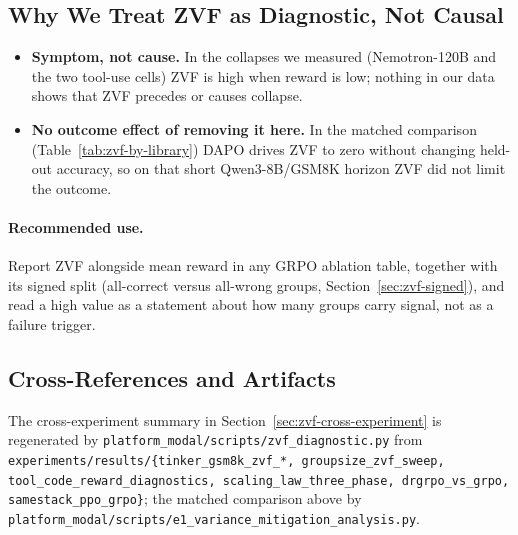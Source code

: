 \subsection{Why We Treat ZVF as Diagnostic, Not Causal}
\label{sec:zvf-caveat}
\begin{itemize}
\item \textbf{Symptom, not cause.} In the collapses we measured (Nemotron-120B and
the two tool-use cells) ZVF is high when reward is low; nothing in our data shows
that ZVF precedes or causes collapse.
\item \textbf{No outcome effect of removing it here.} In the matched comparison
(Table~\ref{tab:zvf-by-library}) DAPO drives ZVF to zero without changing held-out
accuracy, so on that short Qwen3-8B/GSM8K horizon ZVF did not limit the outcome.
\end{itemize}

\paragraph{Recommended use.} Report ZVF alongside mean reward in any GRPO
ablation table, together with its signed split (all-correct versus all-wrong
groups, Section~\ref{sec:zvf-signed}), and read a high value as a statement about
how many groups carry signal, not as a failure trigger.

\subsection{Cross-References and Artifacts}
\label{sec:zvf-artifacts}
The cross-experiment summary in Section~\ref{sec:zvf-cross-experiment} is
regenerated by \texttt{platform\_modal/scripts/zvf\_diagnostic.py} from
\texttt{experiments/results/\{tinker\_gsm8k\_zvf\_*, groupsize\_zvf\_sweep,
tool\_code\_reward\_diagnostics, scaling\_law\_three\_phase, drgrpo\_vs\_grpo,
samestack\_ppo\_grpo\}}; the matched comparison above by
\texttt{platform\_modal/scripts/e1\_variance\_mitigation\_analysis.py}.
